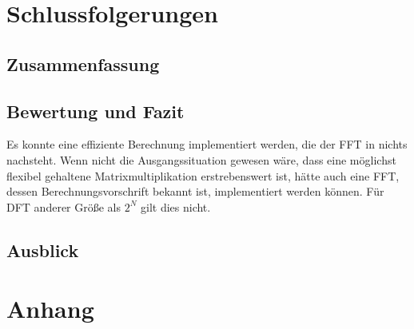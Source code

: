  \chapter{Schlussfolgerungen}
 \section{Zusammenfassung}
 \section{Bewertung und Fazit}
 Es konnte eine effiziente Berechnung implementiert werden, die der FFT in nichts nachsteht. Wenn nicht die Ausgangssituation gewesen wäre, dass eine möglichst flexibel gehaltene
 Matrixmultiplikation erstrebenswert ist, hätte auch eine FFT, dessen Berechnungsvorschrift bekannt ist, implementiert werden können. Für DFT anderer Größe als $2^N$ gilt dies nicht.
 
 
 \section{Ausblick}
 
 
 \printglossary[title={Abkürzungsverzeichnis}] 
 
 \listoffigures

 \listoftables

 
 \printbibliography
 
 \chapter{Anhang}
 


